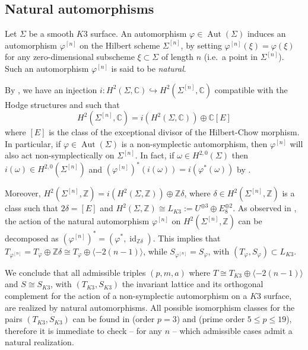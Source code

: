 \documentclass{amsart}
\theoremstyle{definition}
\newcommand{\IC }{\mathbb{C}}
\newcommand{\IZ}{\mathbb{Z}}
\newcommand{\coloneqq}{:=}
\DeclareMathOperator{\id}{id}
\DeclareMathOperator{\aut}{Aut}
\begin{document}
\subsection{Natural automorphisms} \label{subsect: natural auto}
 
Let $\Sigma$ be a smooth $K3$ surface. An automorphism $\varphi \in \aut(\Sigma)$ induces an automorphism $\varphi^{[n]}$ on the Hilbert scheme $\Sigma^{[n]}$, by setting $\varphi^{[n]}(\xi) = \varphi(\xi)$ for any zero-dimensional subscheme $\xi \subset \Sigma$ of length $n$ (i.e.\ a point in $\Sigma^{[n]}$). Such an automorphism $\varphi^{[n]}$ is said to be \emph{natural}.

By \cite[Proposition 6]{beauville}, we have an injection $i: H^2(\Sigma, \IC) \hookrightarrow H^2(\Sigma^{[n]}, \IC)$ compatible with the Hodge structures and such that
\[ H^2(\Sigma^{[n]}, \IC) = i\left( H^2(\Sigma, \IC) \right) \oplus \IC[E]\]
\noindent where $[E]$ is the class of the exceptional divisor of the Hilbert-Chow morphism. In particular, if $\varphi \in \aut(\Sigma)$ is a non-symplectic automorphism, then $\varphi^{[n]}$ will also act non-symplectically on $\Sigma^{[n]}$. In fact, if $\omega \in H^{2,0}(\Sigma)$ then $i(\omega) \in H^{2,0}(\Sigma^{[n]})$ and $\left( \varphi^{[n]} \right)^*(i(\omega)) = i\left( \varphi^*(\omega)\right)$ by \cite[Theorem 1]{bs}.

Moreover, $H^2(\Sigma^{[n]}, \IZ) = i\left( H^2(\Sigma, \IZ) \right) \oplus \IZ \delta$, where $\delta \in H^2(\Sigma^{[n]}, \IZ)$ is a class such that $2\delta = [E]$ and $H^2(\Sigma, \IZ) \cong L_{K3} \coloneqq U^{\oplus 3} \oplus E_8^{\oplus 2}$. As observed in \cite[\S 3]{bs}, the action of the natural automorphism $\varphi^{[n]}$ on $H^2(\Sigma^{[n]}, \IZ)$ can be decomposed as $\left( \varphi^{[n]} \right)^* = (\varphi^*, \id_{\IZ \delta})$. This implies that $T_{\varphi^{[n]}} = T_\varphi \oplus \IZ \delta \cong T_\varphi \oplus \langle -2(n-1) \rangle$, while $S_{\varphi^{[n]}} = S_\varphi$, with $(T_\varphi, S_\varphi) \subset L_{K3}$.

We conclude that all admissible triples $(p,m,a)$ where $T \cong T_{K3} \oplus \langle -2(n-1) \rangle$ and $S \cong S_{K3}$, with $(T_{K3}, S_{K3})$ the invariant lattice and its orthogonal complement for the action of a non-symplectic automorphism on a $K3$ surface, are realized by natural automorphisms. All possible isomorphism classes for the pairs $(T_{K3}, S_{K3})$  can be found in \cite{autom_k3_ord3} (order $p=3$) and \cite{autom_k3} (prime order $5 \leq p \leq 19$), therefore it is immediate to check -- for any $n$ -- which admissible cases admit a natural realization.
\end{document}
